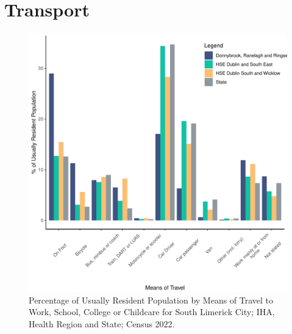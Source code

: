 \documentclass{article}
\begin{document}
\section{Transport}\label{sect:Trans}
\begin{figure}[H]
	\centering
	\includegraphics[width = 120mm]{../figures/TravelED.pdf}
	\caption{Percentage of Usually Resident Population by Means of Travel to Work, School, College or Childcare for South Limerick City; IHA, Health Region and State; Census 2022.}
	\label{fig:vbnv}
	\end{figure}
\end{document}
